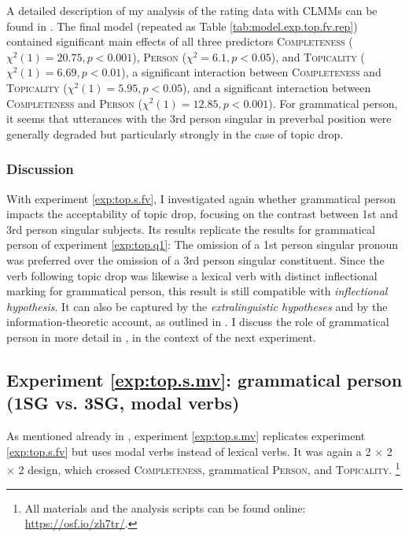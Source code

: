 A detailed description of my analysis of the rating data with CLMMs can be found in .
The final model (repeated as Table \ref{tab:model.exp.top.fv.rep}) contained significant main effects of all three predictors \textsc{Completeness} ($\chi^2(1) = 20.75, p < 0.001$), \textsc{Person} ($\chi^2 = 6.1, p < 0.05$), and \textsc{Topicality} ($\chi^2(1) = 6.69, p < 0.01$), a significant interaction between \textsc{Completeness} and \textsc{Topicality} ($\chi^2(1) = 5.95, p < 0.05$), and a significant interaction between \textsc{Completeness} and \textsc{Person} ($\chi^2(1) = 12.85, p < 0.001$).
For grammatical person, it seems that utterances with the 3rd person singular in preverbal position were generally degraded but particularly strongly in the case of topic drop.

\subsubsection{Discussion}\label{sec:exp.top.fv.diss.person}
With experiment \ref*{exp:top.s.fv}, I investigated again whether grammatical person impacts the acceptability of topic drop, focusing on the contrast between 1st and 3rd person singular subjects. 
Its results replicate the results for grammatical person of experiment \ref*{exp:top.q1}:
The omission of a 1st person singular pronoun was preferred over the omission of a 3rd person singular constituent.
Since the verb following topic drop was likewise a lexical verb  with distinct inflectional marking  for grammatical person, this result is still compatible with  \textit{inflectional hypothesis}.
It can also be captured by the \textit{extralinguistic hypotheses} and by the information-theoretic account, as outlined in .
I discuss the role of grammatical person in more detail in , in the context of the next experiment. 

\subsection{Experiment \ref*{exp:top.s.mv}: grammatical person (1SG vs. 3SG, modal verbs)}
\label{sec:exp.top.s.mv.person}
As mentioned already in , experiment \ref*{exp:top.s.mv} replicates experiment \ref*{exp:top.s.fv} but uses modal verbs instead of lexical verbs.
It was again a 2 $\times$ 2 $\times$ 2 design, which crossed \textsc{Completeness}, grammatical \textsc{Person}, and \textsc{Topicality}.%
\footnote{All materials and the analysis scripts can be found online: \url{https://osf.io/zh7tr/}.}
%


